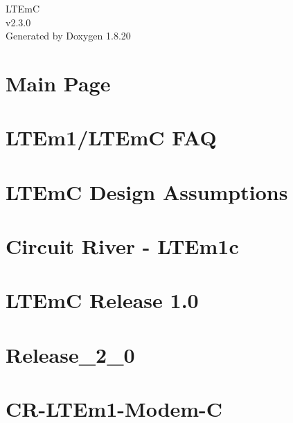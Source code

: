 \let\mypdfximage\pdfximage\def\pdfximage{\immediate\mypdfximage}\documentclass[twoside]{book}
\newcommand{\+}{\discretionary{\mbox{\scriptsize$\hookleftarrow$}}{}{}}
\newcommand{\clearemptydoublepage}{%
  \newpage{\pagestyle{empty}\cleardoublepage}%
}
\begin{document}
\hypersetup{pageanchor=false,
             bookmarksnumbered=true,
             pdfencoding=unicode
            }
\begin{titlepage}
\vspace*{7cm}
\begin{center}%
{\Large L\+T\+EmC \\[1ex]\large v2.\+3.\+0 }\\
\vspace*{1cm}
{\large Generated by Doxygen 1.8.20}\\
\end{center}
\end{titlepage}
\clearemptydoublepage
{}
\tableofcontents
\clearemptydoublepage
{}
\hypersetup{pageanchor=true}

\chapter{Main Page}
\label{index}\hypertarget{index}{}
\chapter{L\+T\+Em1/\+L\+T\+EmC F\+AQ}
\label{md__l_t_em1-_f_a_q}

\chapter{L\+T\+EmC Design Assumptions}
\label{md__l_t_em_c__design__assumptions}

\chapter{Circuit River -\/ L\+T\+Em1c}
\label{md__r_e_a_d_m_e}

\chapter{L\+T\+EmC Release 1.0}
\label{md__release_1_0}

\chapter{Release\+\_\+2\+\_\+0}
\label{md__release_2_0}

\chapter{C\+R-\/\+L\+T\+Em1-\/\+Modem-\/C}
\label{md_tests__l_t_em_c-1-platform__r_e_a_d_m_e}

\end{document}
